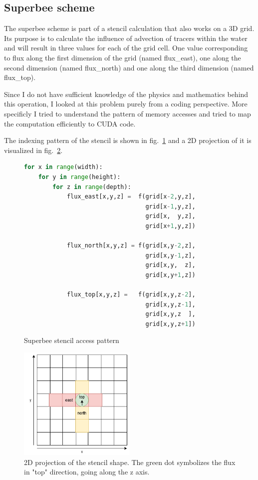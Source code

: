 \documentclass[a4paper,oneside]{memoir}
\begin{document}
\subsection{Superbee scheme}
The superbee scheme is part of a stencil calculation that also works on a 3D grid.
Its purpose is to calculate the influence of advection of tracers within the water and will result in three values for each of the grid cell. One value corresponding to flux along the first dimension of the grid (named flux\_east), one along the second dimension (named flux\_north) and one along the third dimension (named flux\_top).

Since I do not have sufficient knowledge of the physics and mathematics behind this operation, I looked at this problem purely from a coding perspective. More specificly I tried to understand the pattern of memory accesses and tried to map the computation efficiently to CUDA code.

The indexing pattern of the stencil is shown in fig.~\ref{fig:stencil_code} and a 2D projection of it is visualized in fig.~\ref{fig:stencil_shape}. 

\begin{figure}[hbtp]
    \caption{Superbee stencil access pattern}
    \label{fig:stencil_code}
    \begin{lstlisting}[language=python,frame=single]
for x in range(width):
    for y in range(height):
        for z in range(depth):
            flux_east[x,y,z] =  f(grid[x-2,y,z], 
                                  grid[x-1,y,z],
                                  grid[x,  y,z],
                                  grid[x+1,y,z])

            flux_north[x,y,z] = f(grid[x,y-2,z], 
                                  grid[x,y-1,z],
                                  grid[x,y,  z],
                                  grid[x,y+1,z])

            flux_top[x,y,z] =   f(grid[x,y,z-2], 
                                  grid[x,y,z-1],
                                  grid[x,y,z  ],
                                  grid[x,y,z+1])
    \end{lstlisting}
\end{figure}
\begin{figure}[h]
    \centering
    \includegraphics[width=0.5\textwidth]{stencil.png}
    \caption{2D projection of the stencil shape. The green dot symbolizes the flux in "top" direction, going along the z axis.}
    \label{fig:stencil_shape}
\end{figure}
\end{document}
